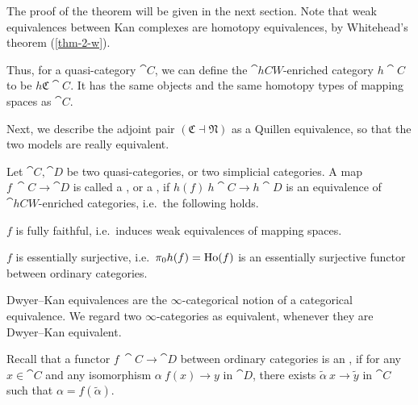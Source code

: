 The proof of the theorem will be given in the next section.
Note that weak equivalences between Kan complexes
are homotopy equivalences,
by Whitehead's theorem (\ref{thm-2-w}).

Thus, for a quasi-category $\cat C$, we can define the 
$\cat{hCW}$-enriched category $h\cat C$ to be $h\mathfrak C\cat C$.
It has the same objects and the same homotopy types of mapping spaces as $\cat C$.

Next, we describe the adjoint pair $(\mathfrak C\dashv\mathfrak N)$
as a Quillen equivalence,
so that the two models are really equivalent.

\begin{definition}
    Let $\cat C,\cat D$ be two quasi-categories, or two simplicial categories.
    A map $f\:\cat C\to\cat D$ is called a ,
    or a , if $h(f)\:h\cat C\to h\cat D$
    is an equivalence of $\cat{hCW}$-enriched categories, i.e.\ the following holds.
    \begin{itms}
        \item $f$ is fully faithful, i.e.\ induces weak equivalences of mapping spaces.
        \item $f$ is essentially surjective, i.e.\ $\pi_0h(f)=\operatorname{Ho}(f)$
        is an essentially surjective functor between ordinary categories.
    \end{itms}
\end{definition}

\begin{remark}
    Dwyer--Kan equivalences are the $\infty$-categorical notion
    of a categorical equivalence.
    We regard two $\infty$-categories as equivalent,
    whenever they are Dwyer--Kan equivalent. \varqed
\end{remark}

Recall that a functor $f\:\cat C\to\cat D$ between ordinary categories is an ,
if for any $x\in\cat C$ and any isomorphism $\alpha\:f(x)\to y$ in $\cat D$,
there exists $\tilde\alpha\:x\to\tilde y$ in $\cat C$ such that $\alpha=f(\tilde\alpha)$.

